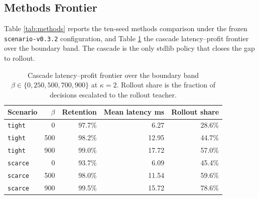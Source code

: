 \documentclass[11pt]{article}
\begin{document}
\subsection{Methods Frontier}

Table \ref{tab:methods} reports the ten-seed methods comparison under the
frozen \texttt{scenario-v0.3.2} configuration, and Table
\ref{tab:frontier} the cascade latency--profit frontier over the boundary
band. The cascade is the only stdlib policy that closes the gap to
rollout.

\begin{table}[t]
\centering
\caption{Ten-seed methods comparison under \texttt{scenario-v0.3.2}.
Retention is mean closed-loop profit relative to the rollout teacher. The
cascade row uses a single \emph{common} representative band
$\beta = \$500$ for both scenarios at frozen scarcity threshold
$\kappa = 2$---not the per-scenario best frontier point (the full frontier
in Table~\ref{tab:frontier} peaks at a higher band on \texttt{scarce}).
The last column is the paired-bootstrap $95\%$ CI on the
cascade-minus-rollout profit delta ($n = 10$); an interval containing \$0
means the cascade is statistically indistinguishable from rollout.}
\label{tab:methods}
\small
{}
\end{table}

\begin{table}[t]
\centering
\caption{Cascade latency--profit frontier over the boundary band
$\beta \in \{0, 250, 500, 700, 900\}$ at $\kappa = 2$. Rollout share is
the fraction of decisions escalated to the rollout teacher.}
\label{tab:frontier}
\small
\begin{tabular}{lrrrr}
\toprule
Scenario & $\beta$ & Retention & Mean latency ms & Rollout share \\
\midrule
\texttt{tight}  &   0 & 97.7\% &  6.27 & 28.6\% \\
\texttt{tight}  & 500 & 98.2\% & 12.95 & 44.7\% \\
\texttt{tight}  & 900 & 99.0\% & 17.72 & 57.0\% \\
\texttt{scarce} &   0 & 93.7\% &  6.09 & 45.4\% \\
\texttt{scarce} & 500 & 98.0\% & 11.54 & 59.6\% \\
\texttt{scarce} & 900 & 99.5\% & 15.72 & 78.6\% \\
\bottomrule
\end{tabular}
\end{table}
\end{document}
